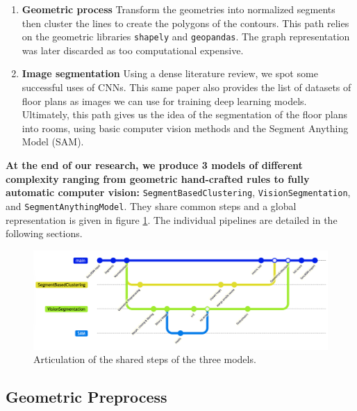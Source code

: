\documentclass[11pt]{article}
\begin{document}
\begin{enumerate}
    \item \textbf{Geometric process} Transform the geometries into normalized segments 
    \cite{Schafer2011AutomaticGO} then cluster the lines to 
    create the polygons\cite{dominguez2012Semiautomaticdetection} of the contours. This path relies on the
    geometric libraries \texttt{shapely} and \texttt{geopandas}. The graph representation 
    was later discarded as too computational expensive.
    \item \textbf{Image segmentation} Using a dense literature review\cite{PIZARRO2022104348}, we 
    spot some successful uses of CNNs\cite{ijgi10020097}. This same paper also provides the list
    of datasets of floor plans as images we can use for training deep learning models.
    Ultimately, this path gives us the idea of the segmentation of the floor plans 
    into rooms, using basic computer vision methods and the Segment 
    Anything Model (SAM)\cite{kirillov2023segment}.
\end{enumerate}

\textbf{At the end of our research, we produce 3 models of different complexity
ranging from geometric hand-crafted rules to fully automatic computer vision:} 
\texttt{SegmentBasedClustering}, 
\texttt{VisionSegmentation}, 
and \texttt{SegmentAnythingModel}. They share common steps and a global representation
is given in figure \ref{fig:global_pipeline}. The individual pipelines are detailed 
in the following sections.
\begin{figure}[h]
    \centering
    \includegraphics[width=0.99\linewidth]{figures/CapstoneGit.png}
    \caption{Articulation of the shared steps of the three models.}
    \label{fig:global_pipeline}
\end{figure}

\subsection{Geometric Preprocess}
\label{sec:geometric_preprocess}
\end{document}
